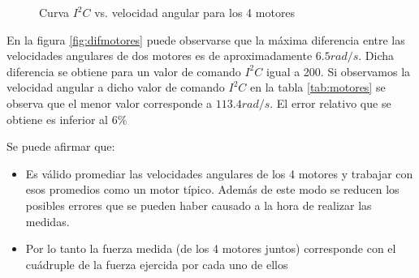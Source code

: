 \documentclass[main]{subfiles}
\begin{document}
\begin{figure}[h!]
  \begin{center}
		
  \end{center}
  \caption{Curva $I^2C$ vs. velocidad angular para los 4 motores}

\end{figure}

En la figura \ref{fig:difmotores} puede observarse que la m\'axima diferencia entre las velocidades angulares de dos motores es de aproximadamente $6.5 rad/s$. Dicha diferencia se obtiene para un valor de comando $I^2C$ igual a 200. Si observamos la velocidad angular a dicho valor de comando $I^2C$ en la tabla \ref{tab:motores} se observa que el menor valor corresponde a $113.4 rad/s$. El error relativo que se obtiene es inferior al $6\%$


Se puede afirmar que:
\begin{itemize}
\item Es v\'alido promediar las velocidades angulares de los 4 motores y trabajar con esos promedios como un motor típico. Adem\'as de este modo se reducen los posibles errores que se pueden haber causado a la hora de realizar las medidas.
\item Por lo tanto la fuerza medida (de los 4 motores juntos) corresponde con el cu\'adruple de la fuerza ejercida por cada uno de ellos
\end{itemize}
\end{document}
